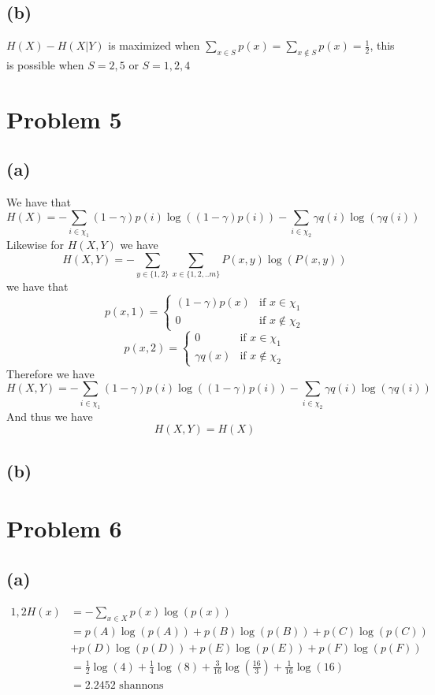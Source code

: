 \subsection*{(b)}
$H(X)-H(X|Y)$ is maximized when 
$\sum_{x\in S}p(x)=\sum_{x\notin S}p(x)=\frac{1}{2}$, this is possible
when $S=\boxed{2,5}$ or $S=\boxed{1,2,4}$
\section*{Problem 5}
\subsection*{(a)}
We have that 
$$H(X)=-\sum_{i\in \chi_1}(1-\gamma)p(i)\log\left((1-\gamma)p(i)\right)-
\sum_{i\in \chi_2}\gamma q(i)\log\left(\gamma q(i)\right)$$
Likewise for $H(X,Y)$ we have
$$H(X,Y)=-\sum_{y \in \{1,2\}}\sum_{x\in\{1,2,..m\}}P(x,y)\log(P(x,y))$$
we have that
$$p(x,1)=\begin{cases}
	(1-\gamma)p(x) & \text{if } x\in \chi_1\\
	0 & \text{if } x\notin \chi_2
\end{cases}$$
$$p(x,2)=\begin{cases}
	0 & \text{if } x\in \chi_1\\
	\gamma q(x) & \text{if } x\notin \chi_2
\end{cases}$$
Therefore we have
$$H(X,Y)=-\sum_{i\in \chi_1}(1-\gamma)p(i)\log\left((1-\gamma)p(i)\right)-
\sum_{i\in \chi_2}\gamma q(i)\log\left(\gamma q(i)\right)$$
And thus we have 
$$\boxed{H(X,Y)=H(X)}$$
\subsection*{(b)}



\section*{Problem 6}
\subsection*{(a)}
\begin{align*}1,2
	H(x)&=-\sum_{x\in X} p(x)\log(p(x))\\
	&=p(A)\log(p(A))+p(B)\log(p(B))+p(C)\log(p(C))\\&+p(D)\log(p(D))+p(E)\log(p(E))+p(F)\log(p(F))\\
	&=\frac{1}{2}\log(4)+\frac{1}{4}\log(8)+\frac{3}{16}\log(\frac{16}{3})+\frac{1}{16}\log(16)\\
	&=\boxed{2.2452\text{ shannons}}
\end{align*}

